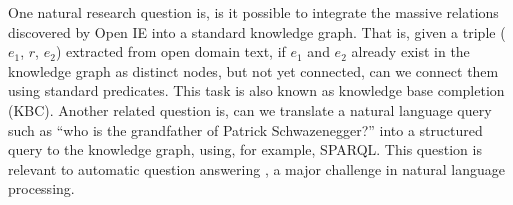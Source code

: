 One natural research question is, is it possible to integrate
the massive relations discovered by Open IE into a standard
knowledge graph. That is, given a triple ($e_1$, $r$, $e_2$) extracted from
open domain text, if $e_1$ and $e_2$ already exist in the knowledge
graph as distinct nodes, but not yet connected, can we connect them using
standard predicates. This task is also known as 
knowledge base completion (KBC).
Another related question is, can we translate a natural
language query such as ``who is the grandfather of Patrick Schwazenegger?'' 
into a structured query to the knowledge graph, using, for example, SPARQL.
This question is relevant to automatic question answering
\cite{berant2013semantic,berant2014semantic,lao2011random,yao2014information,zou2014natural},
a major challenge in natural language processing. 

